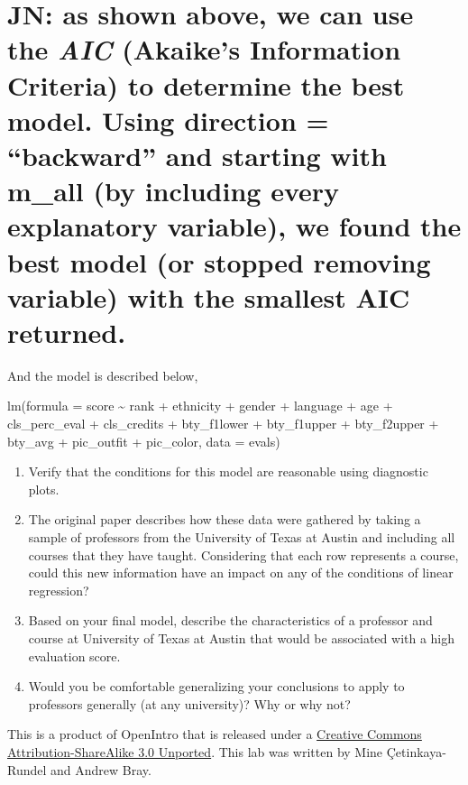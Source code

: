 \documentclass[]{article}
\begin{document}
\section{\texorpdfstring{JN: as shown above, we can use the \emph{AIC}
(Akaike's Information Criteria) to determine the best model. Using
direction = ``backward'' and starting with m\_all (by including every
explanatory variable), we found the best model (or stopped removing
variable) with the smallest AIC
returned.}{JN: as shown above, we can use the AIC (Akaike's Information Criteria) to determine the best model. Using direction = backward and starting with m\_all (by including every explanatory variable), we found the best model (or stopped removing variable) with the smallest AIC returned.}}\label{jn-as-shown-above-we-can-use-the-aic-akaikes-information-criteria-to-determine-the-best-model.-using-direction-backward-and-starting-with-m_all-by-including-every-explanatory-variable-we-found-the-best-model-or-stopped-removing-variable-with-the-smallest-aic-returned.}

And the model is described below,

lm(formula = score \textasciitilde{} rank + ethnicity + gender +
language + age + cls\_perc\_eval + cls\_credits + bty\_f1lower +
bty\_f1upper + bty\_f2upper + bty\_avg + pic\_outfit + pic\_color, data
= evals)

\begin{enumerate}
\def\labelenumi{\arabic{enumi}.}
\setcounter{enumi}{15}
\item
  Verify that the conditions for this model are reasonable using
  diagnostic plots.
\item
  The original paper describes how these data were gathered by taking a
  sample of professors from the University of Texas at Austin and
  including all courses that they have taught. Considering that each row
  represents a course, could this new information have an impact on any
  of the conditions of linear regression?
\item
  Based on your final model, describe the characteristics of a professor
  and course at University of Texas at Austin that would be associated
  with a high evaluation score.
\item
  Would you be comfortable generalizing your conclusions to apply to
  professors generally (at any university)? Why or why not?
\end{enumerate}

\hypertarget{license}{}
This is a product of OpenIntro that is released under a
\href{http://creativecommons.org/licenses/by-sa/3.0}{Creative Commons
Attribution-ShareAlike 3.0 Unported}. This lab was written by Mine
Çetinkaya-Rundel and Andrew Bray.
\end{document}
